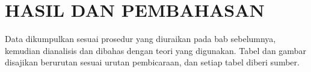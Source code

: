 \chapter{HASIL DAN PEMBAHASAN}
Data dikumpulkan sesuai prosedur yang diuraikan pada bab sebelumnya, kemudian dianalisis dan
dibahas dengan teori yang digunakan. Tabel dan gambar disajikan berurutan sesuai urutan
pembicaraan, dan setiap tabel diberi sumber.
